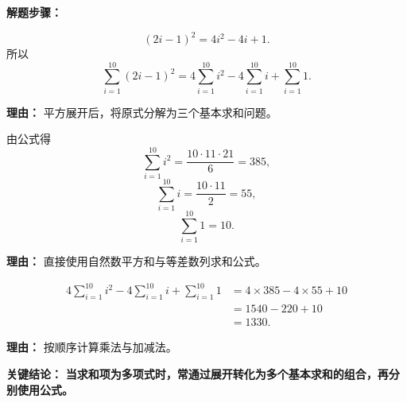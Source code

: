 \begin{examplebox}
	\textbf{\textcolor{CExample}{解题步骤：}}
	\begin{description}[style=nextline, leftmargin=2.8em, labelsep=0.5em, itemsep=0.45em]
		\item[\textbf{第一步（展开通项）：}]
		      \[
			      (2i-1)^2=4i^2-4i+1.
		      \]
		      所以
		      \[
			      \sum_{i=1}^{10}(2i-1)^2
			      =4\sum_{i=1}^{10}i^2-4\sum_{i=1}^{10}i+\sum_{i=1}^{10}1.
		      \]
		      \par\textbf{理由：} 平方展开后，将原式分解为三个基本求和问题。
		\item[\textbf{第二步（代入幂和）：}]
		      由公式得
		      \[
			      \sum_{i=1}^{10}i^2=\frac{10\cdot11\cdot21}{6}=385,
		      \]
		      \[
			      \sum_{i=1}^{10}i=\frac{10\cdot11}{2}=55,
		      \]
		      \[
			      \sum_{i=1}^{10}1=10.
		      \]
		      \par\textbf{理由：} 直接使用自然数平方和与等差数列求和公式。
		\item[\textbf{第三步（合并结果）：}]
		      \[
			      \begin{aligned}
				      4\sum_{i=1}^{10}i^2-4\sum_{i=1}^{10}i+\sum_{i=1}^{10}1
				       & =4\times385-4\times55+10 \\
				       & =1540-220+10             \\
				       & =1330.
			      \end{aligned}
		      \]
		      \par\textbf{理由：} 按顺序计算乘法与加减法。
	\end{description}

	\textbf{\textcolor{CExample}{关键结论：}}
	\textbf{当求和项为多项式时，常通过展开转化为多个基本求和的组合，再分别使用公式。}
\end{examplebox}